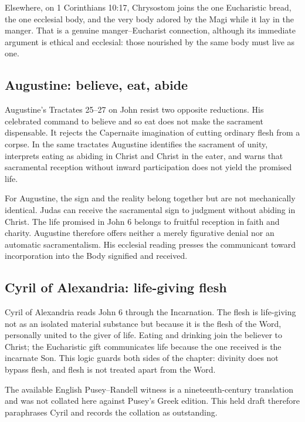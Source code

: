 \begin{deepstudy}
Elsewhere, on 1 Corinthians 10:17, Chrysostom joins the one Eucharistic bread,
the one ecclesial body, and the very body adored by the Magi while it lay in the
manger. That is a genuine manger--Eucharist connection, although its immediate
argument is ethical and ecclesial: those nourished by the same body must live
as one.

\subsection{Augustine: believe, eat, abide}

Augustine's Tractates 25--27 on John resist two opposite reductions. His
celebrated command to believe and so eat does not make the sacrament
dispensable. It rejects the Capernaite imagination of cutting ordinary flesh
from a corpse. In the same tractates Augustine identifies the sacrament of
unity, interprets eating as abiding in Christ and Christ in the eater, and
warns that sacramental reception without inward participation does not yield
the promised life.

For Augustine, the sign and the reality belong together but are not
mechanically identical. Judas can receive the sacramental sign to judgment
without abiding in Christ. The life promised in John 6 belongs to fruitful
reception in faith and charity. Augustine therefore offers neither a merely
figurative denial nor an automatic sacramentalism. His ecclesial reading
presses the communicant toward incorporation into the Body signified and
received.

\subsection{Cyril of Alexandria: life-giving flesh}

Cyril of Alexandria reads John 6 through the Incarnation. The flesh is
life-giving not as an isolated material substance but because it is the flesh
of the Word, personally united to the giver of life. Eating and drinking join
the believer to Christ; the Eucharistic gift communicates life because the
one received is the incarnate Son. This logic guards both sides of the
chapter: divinity does not bypass flesh, and flesh is not treated apart from
the Word.

The available English Pusey--Randell witness is a nineteenth-century
translation and was not collated here against Pusey's Greek edition. This held
draft therefore paraphrases Cyril and records the collation as outstanding.


\end{deepstudy}

